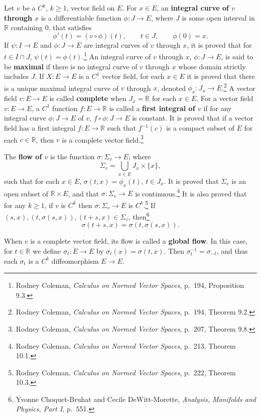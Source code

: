 \documentclass{article}
\theoremstyle{definition}
\begin{document}
Let $v$ be a $C^k$, $k \geq 1$, vector field on $E$.
For $x \in E$, an \textbf{integral curve of $v$ through $x$} is a differentiable function $\phi:J \to E$,
where $J$ is some open interval in $\mathbb{R}$ containing $0$, that satisfies
\[
\phi'(t) = (v \circ \phi)(t), \qquad t \in J, \qquad \phi(0)=x.
\]
If $\psi:I \to E$ and $\phi:J \to E$ are integral curves of $v$ through $x$, it is proved that 
for $t \in I \cap J$, $\psi(t)=\phi(t)$.\footnote{Rodney Coleman, {\em Calculus on Normed Vector Spaces}, p.~194, Proposition 9.3.}
An integral curve of $v$ through $x$, $\phi:J \to E$, is said to be \textbf{maximal} if
there is no integral curve of $v$ through $x$ whose domain strictly includes $J$. 
If $X:E \to E$ is a $C^1$ vector field,  for each $x \in E$ it is proved that there is a unique maximal integral curve of $v$ through $x$, denoted
$\phi_x:J_x \to E$.\footnote{Rodney Coleman, {\em Calculus on Normed Vector Spaces}, p.~194, Theorem 9.2.}
A vector field $v:E \to E$ is called \textbf{complete} when $J_x=\mathbb{R}$ for each $x \in E$. 
For a vector field $v:E \to E$, a $C^1$ function $f:E \to \mathbb{R}$ is called a \textbf{first integral of $v$} if
for any integral curve $\phi:J \to E$ of $v$, $f \circ \phi:J \to E$ is constant. 
It is proved that if a vector field has a first integral $f:E \to \mathbb{R}$ such that
$f^{-1}(c)$ is a compact subset of $E$ for each $c \in \mathbb{R}$, then
$v$ is a complete vector field.\footnote{Rodney Coleman, {\em Calculus on Normed Vector Spaces}, p.~207, Theorem 9.8.}

The \textbf{flow of $v$} is the function $\sigma:\Sigma_v \to E$, where
\[
\Sigma_v=\bigcup_{x \in E} J_x \times \{x\},
\]
such that for each $x \in E$, 
$\sigma(t,x)=\phi_x(t)$, $t \in J_x$.
It is proved that $\Sigma_v$ is an open subset of $\mathbb{R} \times E$, and that $\sigma:\Sigma_v \to E$ is continuous.\footnote{Rodney Coleman, {\em Calculus on Normed Vector Spaces}, p.~213, Theorem 10.1.}
It is also proved that for any $k \geq 1$, if $v$ is $C^k$ then
$\sigma:\Sigma_v \to E$ is $C^k$.\footnote{Rodney Coleman, {\em Calculus on Normed Vector Spaces}, p.~222, Theorem 10.3.}
If $(s,x),(t,\sigma(s,x)),(t+s,x) \in \Sigma_v$, then\footnote{Yvonne Choquet-Bruhat and Cecile DeWitt-Morette, {\em Analysis, Manifolds and Physics, Part I}, p.~551.}
\[
\sigma(t+s,x) = \sigma(t,\sigma(s,x)).
\]

When $v$ is a complete vector field, its flow is called a \textbf{global flow}. 
In this case, for $t \in \mathbb{R}$ we define $\sigma_t:E \to E$ by $\sigma_t(x)=\sigma(t,x)$. 
Then $\sigma_t^{-1}=\sigma_{-t}$, and thus each $\sigma_t$ is a $C^k$ diffeomorphism $E \to E$. 
\end{document}
